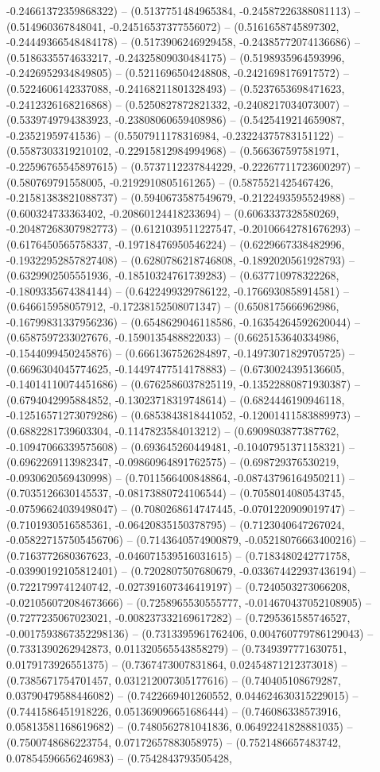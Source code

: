 -0.24661372359868322) -- (0.5137751484965384, -0.24587226388081113) -- (0.514960367848041, -0.24516537377556072) -- (0.5161658745897302, -0.24449366548484178) -- (0.5173906246929458, -0.24385772074136686) -- (0.5186335574633217, -0.24325809030484175) -- (0.5198935964593996, -0.2426952934849805) -- (0.5211696504248808, -0.2421698176917572) -- (0.5224606142337088, -0.24168211801328493) -- (0.5237653698471623, -0.2412326168216868) -- (0.5250827872821332, -0.2408217034073007) -- (0.5339749794383923, -0.23808060659408986) -- (0.5425419214659087, -0.23521959741536) -- (0.5507911178316984, -0.23224375783151122) -- (0.5587303319210102, -0.22915812984994968) -- (0.566367597581971, -0.22596765545897615) -- (0.5737112237844229, -0.22267711723600297) -- (0.580769791558005, -0.2192910805161265) -- (0.5875521425467426, -0.21581383821088737) -- (0.5940673587549679, -0.2122493595524988) -- (0.600324733363402, -0.20860124418233694) -- (0.6063337328580269, -0.20487268307982773) -- (0.6121039511227547, -0.20106642781676293) -- (0.6176450565758337, -0.19718476950546224) -- (0.6229667338482996, -0.19322952857827408) -- (0.6280786218746808, -0.1892020561928793) -- (0.6329902505551936, -0.18510324761739283) -- (0.637710978322268, -0.1809335674384144) -- (0.6422499329786122, -0.1766930858914581) -- (0.646615958057912, -0.17238152508071347) -- (0.6508175666962986, -0.16799831337956236) -- (0.6548629046118586, -0.16354264592620044) -- (0.6587597233027676, -0.1590135488822033) -- (0.6625153640334986, -0.1544099450245876) -- (0.6661367526284897, -0.14973071829705725) -- (0.6696304045774625, -0.14497477514178883) -- (0.6730024395136605, -0.14014110074451686) -- (0.6762586037825119, -0.13522880871930387) -- (0.6794042995884852, -0.13023718319748614) -- (0.6824446190946118, -0.12516571273079286) -- (0.6853843818441052, -0.12001411583889973) -- (0.6882281739603304, -0.1147823584013212) -- (0.6909803877387762, -0.10947066339575608) -- (0.693645260449481, -0.10407951371158321) -- (0.6962269113982347, -0.09860964891762575) -- (0.698729376530219, -0.0930620569430998) -- (0.7011566400848864, -0.08743796164950211) -- (0.7035126630145537, -0.08173880724106544) -- (0.7058014080543745, -0.07596624039498047) -- (0.7080268614747445, -0.0701220909019747) -- (0.7101930516585361, -0.06420835150378795) -- (0.7123040647267024, -0.058227157505456706) -- (0.7143640574900879, -0.05218076663400216) -- (0.7163772680367623, -0.046071539516031615) -- (0.7183480242771758, -0.03990192105812401) -- (0.7202807507680679, -0.033674422937436194) -- (0.7221799741240742, -0.027391607346419197) -- (0.7240503273066208, -0.021056072084673666) -- (0.7258965530555777, -0.014670437052108905) -- (0.7277235067023021, -0.008237332169617282) -- (0.7295361585746527, -0.0017593867352298136) -- (0.7313395961762406, 0.004760779786129043) -- (0.7331390262942873, 0.011320565543858279) -- (0.7349397771630751, 0.0179173926551375) -- (0.7367473007831864, 0.02454871212373018) -- (0.7385671754701457, 0.031212007305177616) -- (0.740405108679287, 0.03790479588446082) -- (0.7422669401260552, 0.044624630315229015) -- (0.7441586451918226, 0.051369096651686444) -- (0.746086338573916, 0.05813581168619682) -- (0.7480562781041836, 0.06492241828881035) -- (0.7500748686223754, 0.07172657883058975) -- (0.7521486657483742, 0.07854596656246983) -- (0.7542843793505428, 
